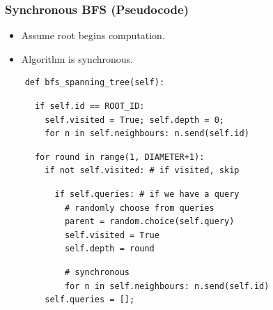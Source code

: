 \documentclass{beamer}
\begin{document}
\begin{frame}[fragile]
    \frametitle{Synchronous BFS (Pseudocode)}
    \begin{itemize}
        \item Assume root begins computation.
        \item Algorithm is synchronous.
    \end{itemize}
    \pause

    \begin{verbatim}
    def bfs_spanning_tree(self):
    \end{verbatim}
    \pause
    \begin{verbatim}
      if self.id == ROOT_ID:
        self.visited = True; self.depth = 0;
        for n in self.neighbours: n.send(self.id)
    \end{verbatim}
    \pause
    \begin{verbatim}
      for round in range(1, DIAMETER+1):
        if not self.visited: # if visited, skip
    \end{verbatim}
    \pause
    \begin{verbatim}
          if self.queries: # if we have a query
            # randomly choose from queries
            parent = random.choice(self.query)
            self.visited = True
            self.depth = round
    \end{verbatim}
    \pause
    \begin{verbatim}
            # synchronous
            for n in self.neighbours: n.send(self.id)
        self.queries = [];
    \end{verbatim}
\end{frame}
\end{document}
